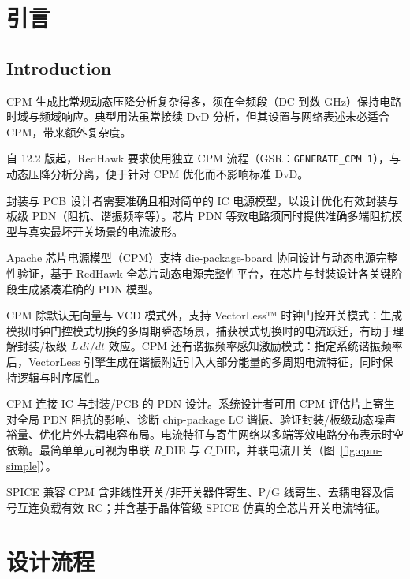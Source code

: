 ﻿%
\label{chap:cpm}

\section{引言}
\subsection*{Introduction}

\begin{noteBox}
CPM 生成比常规动态压降分析复杂得多，须在全频段（DC 到数 GHz）保持电路时域与频域响应。典型用法虽常接续 DvD 分析，但其设置与网络表述未必适合 CPM，带来额外复杂度。

自 12.2 版起，RedHawk 要求使用独立 CPM 流程（GSR：\texttt{GENERATE\_CPM 1}），与动态压降分析分离，便于针对 CPM 优化而不影响标准 DvD。
\end{noteBox}

封装与 PCB 设计者需要准确且相对简单的 IC 电源模型，以设计优化有效封装与板级 PDN（阻抗、谐振频率等）。芯片 PDN 等效电路须同时提供准确多端阻抗模型与真实最坏开关场景的电流波形。

Apache 芯片电源模型（CPM）支持 die-package-board 协同设计与动态电源完整性验证，基于 RedHawk 全芯片动态电源完整性平台，在芯片与封装设计各关键阶段生成紧凑准确的 PDN 模型。

CPM 除默认无向量与 VCD 模式外，支持 VectorLess™ 时钟门控开关模式：生成模拟时钟门控模式切换的多周期瞬态场景，捕获模式切换时的电流跃迁，有助于理解封装/板级 $L\,di/dt$ 效应。CPM 还有谐振频率感知激励模式：指定系统谐振频率后，VectorLess 引擎生成在谐振附近引入大部分能量的多周期电流特征，同时保持逻辑与时序属性。

CPM 连接 IC 与封装/PCB 的 PDN 设计。系统设计者可用 CPM 评估片上寄生对全局 PDN 阻抗的影响、诊断 chip-package LC 谐振、验证封装/板级动态噪声裕量、优化片外去耦电容布局。电流特征与寄生网络以多端等效电路分布表示时空依赖。最简单单元可视为串联 $R\_{\mathrm{DIE}}$ 与 $C\_{\mathrm{DIE}}$，并联电流开关（图~\ref{fig:cpm-simple}）。


SPICE 兼容 CPM 含非线性开关/非开关器件寄生、P/G 线寄生、去耦电容及信号互连负载有效 RC；并含基于晶体管级 SPICE 仿真的全芯片开关电流特征。

\section{设计流程}
